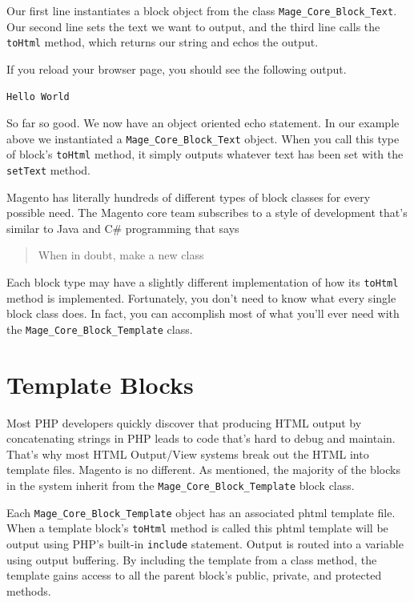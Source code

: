 \documentclass[oneside]{book}
\begin{document}
Our first line instantiates a block object from the class \footnotesize\texttt{Mage\_Core\_Block\_Text}\normalsize.  Our second line sets the text we want to output, and the third line calls the \footnotesize\texttt{toHtml} \normalsize  method, which returns our string and echos the output.

If you reload your browser page, you should see the following output.

\begin{lstlisting}
Hello World

\end{lstlisting}


So far so good. We now have an object oriented echo statement. In our example above we instantiated a \footnotesize\texttt{Mage\_Core\_Block\_Text} \normalsize  object. When you call this type of block's \footnotesize\texttt{toHtml} \normalsize  method, it simply outputs whatever text has been set with the \footnotesize\texttt{setText} \normalsize  method.

Magento has literally hundreds of different types of block classes for every possible need. The Magento core team subscribes to a style of development that's similar to Java and C\# programming that says

\begin{quote}
When in doubt, make a new class
\end{quote}

Each block type may have a slightly different implementation of how its \footnotesize\texttt{toHtml} \normalsize  method is implemented.  Fortunately, you don't need to know what every single block class does.  In fact, you can accomplish most of what you'll ever need with the \footnotesize\texttt{Mage\_Core\_Block\_Template} \normalsize  class.

\section{Template Blocks}

Most PHP developers quickly discover that producing HTML output by concatenating strings in PHP leads to code that's hard to debug and maintain.  That's why most HTML Output/View systems break out the HTML into template files.  Magento is no different.  As mentioned, the majority of the blocks in the system inherit from the \footnotesize\texttt{Mage\_Core\_Block\_Template} \normalsize  block class.

Each \footnotesize\texttt{Mage\_Core\_Block\_Template} \normalsize  object has an associated phtml template file.  When a template block's \footnotesize\texttt{toHtml} \normalsize  method is called this phtml template will be output using PHP's built-in \footnotesize\texttt{include} \normalsize  statement.  Output is routed into a variable using output buffering.  By including the template from a class method, the template gains access to all the parent block's public, private, and protected methods.
\end{document}
